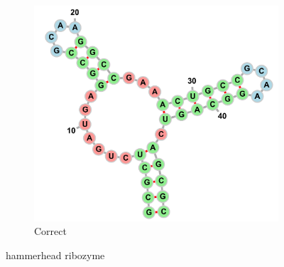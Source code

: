 \documentclass[10pt]{article}
\begin{document}
\begin{figure}[p]
\begin{center}
\begin{subfigure}[b]{0.5\linewidth}
            \includegraphics[width=\linewidth]{./img/hammerhead_ribozyme_correct.png}
            \caption{Correct}
        \end{subfigure}
    \end{center}
\caption{hammerhead ribozyme}
\label{fig:harmmerhead}
\end{figure}
\end{document}
